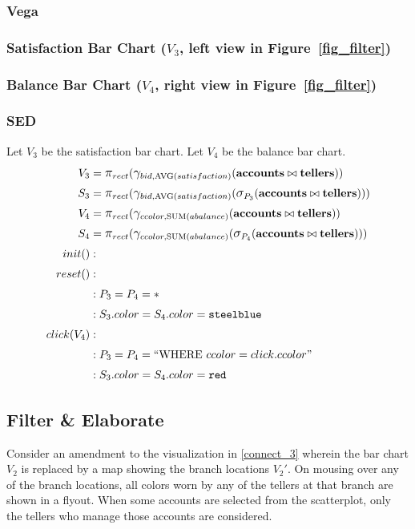 \subsubsection{Vega}
\subsubsection*{Satisfaction Bar Chart ($V_3$, left view in Figure~\ref{fig_filter})}

\subsubsection*{Balance Bar Chart ($V_4$, right view in Figure~\ref{fig_filter})}

\subsubsection{SED}
Let $V_3$ be the satisfaction bar chart.
Let $V_4$ be the balance bar chart.
\begin{align*}
	V_3&= \mathlarger{\pi}_{rect}(\mathlarger{\gamma}_{bid, \text{AVG}(satisfaction)}(\bf{accounts}\bowtie{}\bf{tellers}))\\
	S_3&= \mathlarger{\pi}_{rect}(\mathlarger{\gamma}_{bid, \text{AVG}(satisfaction)}(\mathlarger{\sigma}_{P_3}(\bf{accounts}\bowtie{}\bf{tellers})))\\
	V_4&= \mathlarger{\pi}_{rect}(\mathlarger{\gamma}_{ccolor, \text{SUM}(abalance)}(\bf{accounts}\bowtie{}\bf{tellers}))\\
	S_4&= \mathlarger{\pi}_{rect}(\mathlarger{\gamma}_{ccolor, \text{SUM}(abalance)}(\mathlarger{\sigma}_{P_4}(\bf{accounts}\bowtie{}\bf{tellers})))\\
	init()&:\\
	reset()&:\\
	&: P_3 = P_4 = *\\
	&: S_3.color = S_4.color = \texttt{steelblue}\\
	click(V_4)&:\\
	&: P_3 = P_4 = ``\text{WHERE}~ccolor=click.ccolor"\\
	&: S_3.color = S_4.color = \texttt{red}\\
\end{align*}
\subsection{Filter \& Elaborate}
Consider an amendment to the visualization in \autoref{connect_3} wherein the bar chart $V_2$ is replaced by a map showing the branch locations $V_2'$.
On mousing over any of the branch locations, all colors worn by any of the tellers at that branch are shown in a flyout.
When some accounts are selected from the scatterplot, only the tellers who manage those accounts are considered.
